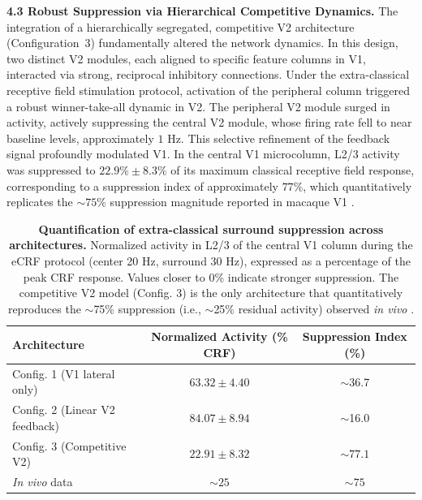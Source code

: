 \label{sec:results_wta}
\textbf{4.3 Robust Suppression via Hierarchical Competitive Dynamics.} The integration of a hierarchically segregated, competitive V2 architecture (Configuration~3) fundamentally altered the network dynamics. In this design, two distinct V2 modules, each aligned to specific feature columns in V1, interacted via strong, reciprocal inhibitory connections. Under the extra-classical receptive field stimulation protocol, activation of the peripheral column triggered a robust winner-take-all dynamic in V2. The peripheral V2 module surged in activity, actively suppressing the central V2 module, whose firing rate fell to near baseline levels, approximately $1$ Hz. This selective refinement of the feedback signal profoundly modulated V1. In the central V1 microcolumn, L2/3 activity was suppressed to $22.9\% \pm 8.3\%$ of its maximum classical receptive field response, corresponding to a suppression index of approximately $77\%$, which quantitatively replicates the $\sim 75\%$ suppression magnitude reported in macaque V1 \citep{Busse2009}.

\begin{table}[t]
  \centering
  \caption{%
    \textbf{Quantification of extra-classical surround suppression across architectures.}
    Normalized activity in L2/3 of the central V1 column during the eCRF protocol (center 20 Hz, surround 30 Hz), expressed as a percentage of the peak CRF response. Values closer to 0\% indicate stronger suppression. The competitive V2 model (Config. 3) is the only architecture that quantitatively reproduces the $\sim$75\% suppression (i.e., $\sim$25\% residual activity) observed \textit{in vivo} \citep{Busse2009}.
  }
  \label{tab:suppression_summary}
  \begin{tabular}{lcc}
    \toprule
    \textbf{Architecture} & \textbf{Normalized Activity (\% CRF)} & \textbf{Suppression Index (\%)} \\
    \midrule
    Config. 1 (V1 lateral only) & $63.32 \pm 4.40$ & $\sim$36.7 \\
    Config. 2 (Linear V2 feedback) & $84.07 \pm 8.94$ & $\sim$16.0 \\
    Config. 3 (Competitive V2) & $\mathbf{22.91 \pm 8.32}$ & $\mathbf{\sim 77.1}$ \\
    \addlinespace
    \textit{In vivo} data \citep{Busse2009} & $\sim 25$ & $\sim 75$ \\
    \bottomrule
  \end{tabular}
\end{table}

